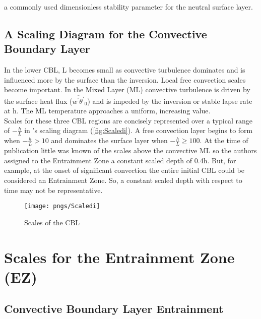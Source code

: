 a commonly used dimensionless stability parameter for the neutral surface layer.%
\subsection{A Scaling Diagram for the Convective Boundary Layer}

In the lower CBL, L becomes small as convective turbulence dominates and is influenced more by the surface than the inversion.  Local free convection scales become important.  In the Mixed Layer (ML) convective turbulence is driven by the surface heat flux ($\overline{w^{'}\theta^{'}}_{0}$) and is impeded by the inversion or stable lapse rate at h. The ML temperature approaches a uniform, increasing value.   
\cite{Stull-BLMetIntro}\\

Scales for these three CBL regions are concisely represented over a typical range of $-\frac{h}{L}$ in \citeauthor{HoltNieu86}'s scaling diagram 
(\autoref{fig:Scaledi}).  A free convection layer begins to form when $-\frac{h}{L} > 10$ and dominates the surface layer when $-\frac{h}{L} \ge 100$.  
At the time of 
publication little was known of the scales above the convective ML so the authors assigned to the Entrainment Zone a constant scaled depth of 
0.4h.  But, for example, at the onset of significant convection the entire initial CBL could be considered an Entrainment Zone. So, a constant scaled depth 
with respect to time may not be representative.
\begin{figure}[!ht]
    \centering
    \texttt{[image: pngs/Scaledi]}
    \caption{Scales of the CBL \cite{HoltNieu86}}
    \label{fig:Scaledi}   %
\end{figure}

\section{Scales for the Entrainment Zone (EZ)}
\label{sec:ScalesfortheEntrainmnetZone}

\subsection{Convective Boundary Layer Entrainment}
\label{subsec:ConvectiveBoundaryLayerEntrainment}

